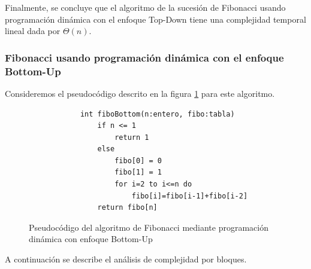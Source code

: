     Finalmente, se concluye que el algoritmo de la sucesión de Fibonacci usando programación dinámica con el enfoque Top-Down tiene una complejidad temporal lineal dada por $\Theta(n)$.
    
    \subsubsection*{Fibonacci usando programación dinámica con el enfoque Bottom-Up}
    Consideremos el pseudocódigo descrito en la figura \ref{PseudocodigoFiboDown} para este algoritmo.
    
    \begin{figure}[h!]
        \centering
        \begin{verbatim}
            int fiboBottom(n:entero, fibo:tabla)
                if n <= 1
                    return 1
                else
                    fibo[0] = 0
                    fibo[1] = 1
                    for i=2 to i<=n do
                        fibo[i]=fibo[i-1]+fibo[i-2]
                return fibo[n]
        \end{verbatim}  
        \caption{Pseudocódigo del algoritmo de Fibonacci mediante programación dinámica con enfoque Bottom-Up}
        \label{PseudocodigoFiboDown}
    \end{figure}
    
    A continuación se describe el análisis de complejidad por bloques.
    
